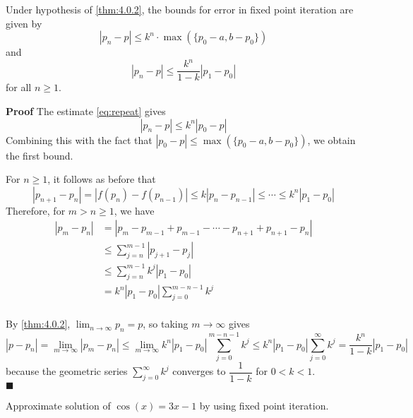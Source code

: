 \documentclass[main.tex]{subfiles}
\begin{document}
\begin{corollary}
    Under hypothesis of \ref{thm:4.0.2}, the bounds for error in fixed point iteration are given by 
    \begin{equation}
        |p_n - p| \le k^n \cdot \max(\{p_0 - a, b-p_0\})
    \end{equation}
    and 
    \begin{equation}
        |p_n - p| \le \dfrac{k^n}{1 - k} |p_1 - p_0|
    \end{equation}
    for all $n \ge 1$.
\end{corollary}
\par \noindent \textbf{Proof} The estimate \ref{eq:repeat} gives
\begin{equation}
    |p_n - p| \le k^n |p_0 - p|
\end{equation}
Combining this with the fact that $|p_0 - p| \le \max(\{p_0 - a, b-p_0\})$, we obtain the first bound. 
\par For $n \ge 1$, it follows as before that 
\begin{equation}
    |p_{n + 1} - p_n| = |f(p_n) - f(p_{n-1})| \le k|p_n - p_{n - 1}| \le \cdots \le k^{n} |p_1 - p_0| 
\end{equation}
Therefore, for $m > n \ge 1$, we have 
\begin{equation}
    \begin{split}
        |p_m - p_n|& = |p_m - p_{m-1} + p_{m-1} - \cdots - p_{n+1} + p_{n+1} - p_n| \\
        & \le \sum_{j=n}^{m-1} |p_{j+1} - p_j| \\
        & \le \sum_{j=n}^{m-1} k^j |p_1 - p_0| \\
        & = k^n |p_1 - p_0| \sum_{j=0}^{m - n - 1} k^j \\ 
    \end{split}
\end{equation}
\par By \ref{thm:4.0.2}, $\lim_{n \rightarrow \infty} p_n = p$, so taking $m \rightarrow \infty$ gives
\begin{equation}
    |p - p_n| = \lim_{m \rightarrow \infty} |p_m - p_n|\le \lim_{m \rightarrow \infty} k^n |p_1 - p_0|\sum_{j=0}^{m - n - 1} k^j \le k^n |p_1 - p_0| \sum_{j=0}^{\infty} k^j = \dfrac{k^n}{1 - k} |p_1 - p_0|
\end{equation}
because the geometric series $\sum_{j=0}^{\infty} k^j$ converges to $\dfrac{1}{1 - k}$ for $0 < k < 1$.
\\ \null \hfill $\blacksquare$ 
\begin{example}
    Approximate solution of $\cos(x) = 3x - 1$ by using fixed point iteration. 
\end{example}
\end{document}
